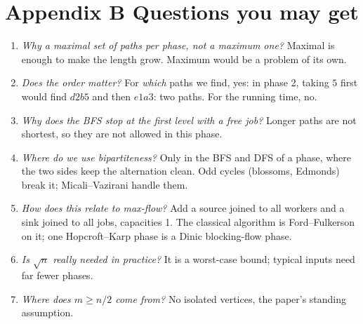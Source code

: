 \documentclass[11pt,a4paper]{article}
\begin{document}
\section*{Appendix B \quad Questions you may get}
\begin{enumerate}[label=\textbf{Q\arabic*.},leftmargin=2.4em,itemsep=5pt]
\item \emph{Why a maximal set of paths per phase, not a maximum one?} Maximal is enough to make the length grow. Maximum would be a problem of its own.
\item \emph{Does the order matter?} For \emph{which} paths we find, yes: in phase 2, taking $5$ first would find $d2b5$ and then $e1a3$: two paths. For the running time, no.
\item \emph{Why does the BFS stop at the first level with a free job?} Longer paths are not shortest, so they are not allowed in this phase.
\item \emph{Where do we use bipartiteness?} Only in the BFS and DFS of a phase, where the two sides keep the alternation clean. Odd cycles (blossoms, Edmonds) break it; Micali--Vazirani handle them.
\item \emph{How does this relate to max-flow?} Add a source joined to all workers and a sink joined to all jobs, capacities 1. The classical algorithm is Ford--Fulkerson on it; one Hopcroft--Karp phase is a Dinic blocking-flow phase.
\item \emph{Is $\sqrt n$ really needed in practice?} It is a worst-case bound; typical inputs need far fewer phases.
\item \emph{Where does $m\ge n/2$ come from?} No isolated vertices, the paper's standing assumption.
\end{enumerate}
\end{document}
